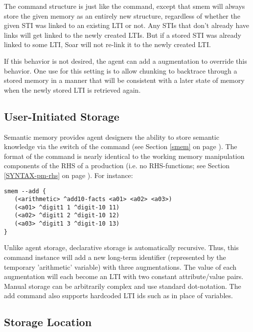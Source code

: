 The  command structure is just like the  command, except that smem will always store the given memory as an entirely new structure, regardless of whether the given STI was linked to an existing LTI or not. Any STIs that don't already have links will get linked to the newly created LTIs. But if a stored STI was already linked to some LTI, Soar will not re-link it to the newly created LTI.

If this behavior is not desired, the agent can add a  augmentation to override this behavior. One use for this setting is to allow chunking to backtrace through a stored memory in a manner that will be consistent with a later state of memory when the newly stored LTI is retrieved again.

\subsection{User-Initiated Storage}

Semantic memory provides agent designers the ability to store semantic knowledge via the  switch of the  command (see Section \ref{smem} on page \pageref{smem}).
The format of the command is nearly identical to the working memory manipulation components of the RHS of a production (i.e. no RHS-functions; see Section \ref{SYNTAX-pm-rhs} on page \pageref{SYNTAX-pm-rhs}).
For instance:

\begin{verbatim}
smem --add {
   (<arithmetic> ^add10-facts <a01> <a02> <a03>)
   (<a01> ^digit1 1 ^digit-10 11)
   (<a02> ^digit1 2 ^digit-10 12)
   (<a03> ^digit1 3 ^digit-10 13)
}
\end{verbatim}

Unlike agent storage, declarative storage is automatically recursive.
Thus, this command instance will add a new long-term identifier (represented by the temporary 'arithmetic' variable) with three augmentations.
The value of each augmentation will each become an LTI with two constant attribute/value pairs.
Manual storage can be arbitrarily complex and use standard dot-notation.
The add command also supports hardcoded LTI ids such as  in place of variables.

\subsection{Storage Location}

